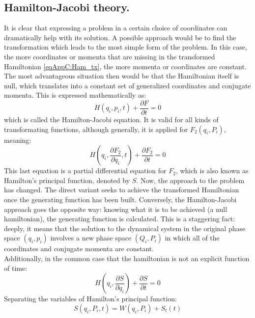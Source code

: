 	\subsection{Hamilton-Jacobi theory.}
	\indent It is clear that expressing a problem in a certain choice of coordinates can dramatically help with its solution. A possible approach would be to find the transformation which leads to the most simple form of the problem. In this case, the more coordinates or momenta that are missing in the transformed Hamiltonian \eqref{eqAppC:Ham_tx}, the more momenta or coordinates are constant. The most advantageous situation then would be that the Hamiltonian itself is null, which translates into a constant set of generalized coordinates and conjugate momenta. This is expressed mathematically as:
	\begin{equation}
	H(q_i, p_i, t) + \dfrac{\partial F}{\partial t} = 0
	\label{eqAppC:HJ_eq}
	\end{equation}
	\noindent which is called the Hamilton-Jacobi equation. It is valid for all kinds of transformating functions, although generally, it is applied for $F_2(q_i, P_i)$, meaning:
	\begin{equation}
	H\left(q_i, \dfrac{\partial F_2}{\partial q_i}, t\right) + \dfrac{\partial F_2}{\partial t} = 0
	\end{equation}
	\indent This last equation is a partial differential equation for $F_2$, which is also known as Hamilton's principal function, denoted by $S$. Now, the approach to the problem has changed. The direct variant seeks to achieve the transformed Hamiltonian once the generating function has been built. Conversely, the Hamilton-Jacobi approach goes the opposite way: knowing what it is to be achieved (a null hamiltonian), the generating function is calculated. This is a staggering fact: deeply, it means that the solution to the dynamical system in the original phase space $(q_i, p_i)$ involves a new phase space $(Q_i, P_i)$ in which all of the coordinates and conjugate momenta are constant. \\
	\indent Additionally, in the common case that the hamiltonian is not an explicit function of time:
	\begin{equation}
	H\left(q_i, \dfrac{\partial S}{\partial q_i}\right) + \dfrac{\partial S}{\partial t} = 0
	\label{eqAppC:HJ_2}
	\end{equation}
	\indent Separating the variables of Hamilton's principal function:
	\begin{equation}
	S(q_i, P_i, t ) = W(q_i, P_i) + S_t(t)
	\label{eqAppC:HJ_3}	
	\end{equation}
